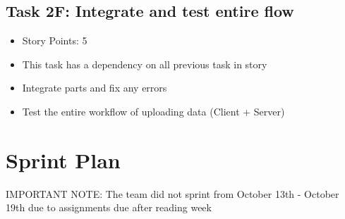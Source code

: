 \documentclass[12pt]{article}
\begin{document}
\subsection{Task 2F: Integrate and test entire flow}
\begin{itemize}%
\item Story Points: 5
\item This task has a dependency on all previous task in story 
\item Integrate parts and fix any errors 
\item Test the entire workflow of uploading data (Client + Server)

\end{itemize}

\newpage
\section{Sprint Plan}
\color{red}IMPORTANT NOTE: The team did not sprint from  October 13th - October 19th due to assignments due after reading week
\color{black}
\end{document}
